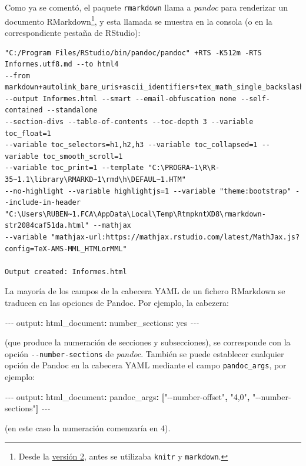 \documentclass[
]{book}
\newenvironment{Shaded}{\begin{snugshade}}{\end{snugshade}}
\newcommand{\AttributeTok}[1]{\textcolor[rgb]{0.77,0.63,0.00}{#1}}
\newcommand{\CharTok}[1]{\textcolor[rgb]{0.31,0.60,0.02}{#1}}
\newcommand{\FunctionTok}[1]{\textcolor[rgb]{0.00,0.00,0.00}{#1}}
\newcommand{\KeywordTok}[1]{\textcolor[rgb]{0.13,0.29,0.53}{\textbf{#1}}}
\newcommand{\PreprocessorTok}[1]{\textcolor[rgb]{0.56,0.35,0.01}{\textit{#1}}}
\newcommand{\StringTok}[1]{\textcolor[rgb]{0.31,0.60,0.02}{#1}}
\theoremstyle{definition}
\theoremstyle{definition}
\theoremstyle{definition}
\theoremstyle{definition}
\theoremstyle{remark}
\begin{document}
Como ya se comentó, el paquete \texttt{rmarkdown} llama a \emph{pandoc} para renderizar un documento
RMarkdown\footnote{Desde la \href{https://blog.rstudio.org/2014/06/18/r-markdown-v2/}{versión 2},
  antes se utilizaba \texttt{knitr} y \texttt{markdown}.}, y esta llamada se muestra en la consola
(o en la correspondiente pestaña de RStudio):

\begin{verbatim}
"C:/Program Files/RStudio/bin/pandoc/pandoc" +RTS -K512m -RTS Informes.utf8.md --to html4 
--from markdown+autolink_bare_uris+ascii_identifiers+tex_math_single_backslash 
--output Informes.html --smart --email-obfuscation none --self-contained --standalone 
--section-divs --table-of-contents --toc-depth 3 --variable toc_float=1 
--variable toc_selectors=h1,h2,h3 --variable toc_collapsed=1 --variable toc_smooth_scroll=1 
--variable toc_print=1 --template "C:\PROGRA~1\R\R-35~1.1\library\RMARKD~1\rmd\h\DEFAUL~1.HTM"
--no-highlight --variable highlightjs=1 --variable "theme:bootstrap" --include-in-header
"C:\Users\RUBEN~1.FCA\AppData\Local\Temp\RtmpkntXD8\rmarkdown-str2084caf51da.html" --mathjax 
--variable "mathjax-url:https://mathjax.rstudio.com/latest/MathJax.js?config=TeX-AMS-MML_HTMLorMML"

Output created: Informes.html
\end{verbatim}

La mayoría de los campos de la cabecera YAML de un fichero RMarkdown se traducen en las opciones de Pandoc.
Por ejemplo, la cabezera:

\begin{Shaded}
\begin{Highlighting}[]
\PreprocessorTok{{-}{-}{-}}
\FunctionTok{output}\KeywordTok{:}
\AttributeTok{  }\FunctionTok{html\_document}\KeywordTok{:}
\AttributeTok{    }\FunctionTok{number\_sections}\KeywordTok{:}\AttributeTok{ }\CharTok{yes}\AttributeTok{      }
\PreprocessorTok{{-}{-}{-}}
\end{Highlighting}
\end{Shaded}

(que produce la numeración de secciones y subsecciones),
se corresponde con la opción \texttt{-\/-number-sections} de \emph{pandoc}.
También se puede establecer cualquier opción de Pandoc en la cabecera YAML
mediante el campo \texttt{pandoc\_args}, por ejemplo:

\begin{Shaded}
\begin{Highlighting}[]
\PreprocessorTok{{-}{-}{-}}
\FunctionTok{output}\KeywordTok{:}
\AttributeTok{  }\FunctionTok{html\_document}\KeywordTok{:}\AttributeTok{ }
\AttributeTok{    }\FunctionTok{pandoc\_args}\KeywordTok{:}\AttributeTok{ }\KeywordTok{[}\StringTok{"{-}{-}number{-}offset"}\KeywordTok{,}\AttributeTok{ }\StringTok{"4,0"}\KeywordTok{,}\AttributeTok{ }\StringTok{"{-}{-}number{-}sections"}\KeywordTok{]}\AttributeTok{      }
\PreprocessorTok{{-}{-}{-}}
\end{Highlighting}
\end{Shaded}

(en este caso la numeración comenzaría en 4).

  
\end{document}
